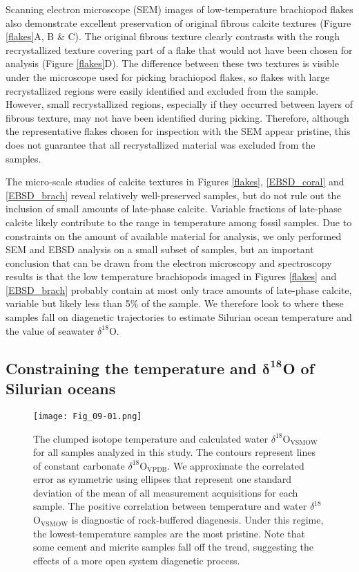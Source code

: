 \documentclass[5p, authoryear]{elsarticle}
\begin{document}
Scanning electron microscope (SEM) images of low-temperature brachiopod flakes also demonstrate excellent preservation of original fibrous calcite textures (Figure \ref{flakes}A, B \& C). The original fibrous texture clearly contrasts with the rough recrystallized texture covering part of a flake that would not have been chosen for analysis (Figure \ref{flakes}D). The difference between these two textures is visible under the microscope used for picking brachiopod flakes, so flakes with large recrystallized regions were easily identified and excluded from the sample. However, small recrystallized regions, especially if they occurred between layers of fibrous texture, may not have been identified during picking. Therefore, although the representative flakes chosen for inspection with the SEM appear pristine, this does not guarantee that all recrystallized material was excluded from the samples.

The micro-scale studies of calcite textures in Figures  \ref{flakes}, \ref{EBSD_coral} and \ref{EBSD_brach} reveal relatively well-preserved samples, but do not rule out the inclusion of small amounts of late-phase calcite. Variable fractions of late-phase calcite likely contribute to the range in temperature among fossil samples. Due to constraints on the amount of available material for analysis, we only performed SEM and EBSD analysis on a small subset of samples, but an important conclusion that can be drawn from the electron microscopy and spectroscopy results is that the low temperature brachiopods imaged in Figures \ref{flakes} and \ref{EBSD_brach} probably contain at most only trace amounts of late-phase calcite, variable but likely less than 5\% of the sample. We therefore look to where these samples fall on diagenetic trajectories to estimate Silurian ocean temperature and the value of seawater $\delta^{18}$O.

\subsection{Constraining the temperature and $\mathbf{\delta^{18}}$O of Silurian oceans} 

\begin{figure}[b]
\centering
\texttt{[image: Fig\_09-01.png]}
\caption{The clumped isotope temperature and calculated water $\delta^{18}$O$_{\text{VSMOW}}$ for all samples analyzed in this study. The contours represent lines of constant carbonate $\delta^{18}$O$_{\text{VPDB}}$. We approximate the correlated error as symmetric using ellipses that represent one standard deviation of the mean of all measurement acquisitions for each sample. The positive correlation between temperature and water $\delta^{18}$O$_{\text{VSMOW}}$ is diagnostic of rock-buffered diagenesis. Under this regime, the lowest-temperature samples are the most pristine. Note that some cement and micrite samples fall off the trend, suggesting the effects of a more open system diagenetic process.}
\label{ellipses}
\end{figure}
\end{document}
